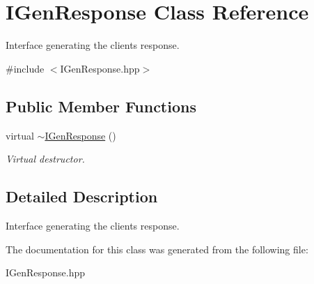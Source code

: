 \hypertarget{class_i_gen_response}{}\section{I\+Gen\+Response Class Reference}
\label{class_i_gen_response}


Interface generating the client\textquotesingle{}s response.  




{\ttfamily \#include $<$I\+Gen\+Response.\+hpp$>$}

\subsection*{Public Member Functions}
\begin{DoxyCompactItemize}
\item 
\hypertarget{class_i_gen_response_a7bba543b82c41a64ff9171893507a1ff}{}virtual \hyperlink{class_i_gen_response_a7bba543b82c41a64ff9171893507a1ff}{$\sim$\+I\+Gen\+Response} ()\label{class_i_gen_response_a7bba543b82c41a64ff9171893507a1ff}

\begin{DoxyCompactList}\small\item\em Virtual destructor. \end{DoxyCompactList}\end{DoxyCompactItemize}


\subsection{Detailed Description}
Interface generating the client\textquotesingle{}s response. 

The documentation for this class was generated from the following file\+:\begin{DoxyCompactItemize}
\item 
I\+Gen\+Response.\+hpp\end{DoxyCompactItemize}
